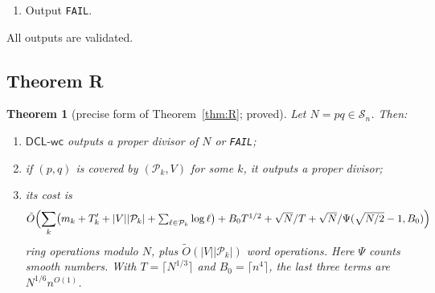 \documentclass[11pt]{amsart}
\newtheorem{theorem}{Theorem}[section]
\theoremstyle{definition}
\newcommand{\Sn}{\mathcal{S}_n}
\newcommand{\DCLwc}{\textsf{DCL-wc}}
\begin{document}
\begin{enumerate}[label=\arabic*.,start=0]
\begin{itemize}
    for $0\le i\le e$, and output any proper value. Otherwise the common order $D$ is now known;
    test $\gcd(1+jD,N)$ for $1\le j\le(\lfloor\sqrt N\rfloor-1)/D$.
  \item \emph{Giants.} Evaluate $f=\prod_{i<m}(X-\gamma^i)$ at all giants as in
    Section~\ref{sec:alg} (for $A<0$ this uses $w_\ell^{-1}$, one inversion per prime). Output any proper gcd, and collect the giants with
    $\gcd(f(G),N)=N$.
  \item \emph{Exploration.} For each such giant, descend the subproduct tree of $f$. At a node
    whose value has gcd $N$, evaluate both children. Output any proper gcd, and descend into the
    children whose gcd is $N$.
  \item \emph{Exact leaf.} If leaf $i$ is reached with $G\equiv\gamma^i\pmod N$, put
    $S=c+\ell^2(g_{\mathrm{lo}}+jm+i)$. If $S^2-4ABN=D_0^2$ is a perfect square, output a proper
    $\gcd((S\pm D_0)/2,N)$.
  \end{itemize}
\item Output \texttt{FAIL}.
\end{enumerate}
All outputs are validated.

\subsection{Theorem R}
\begin{theorem}[precise form of Theorem~\ref{thm:R}; proved]\label{thm:Rprecise}
Let $N=pq\in\Sn$. Then:
\begin{enumerate}[label=(\roman*)]
\item $\DCLwc$ outputs a proper divisor of $N$ or \texttt{FAIL};
\item if $(p,q)$ is covered by $(\mathcal P_k,V)$ for some $k$, it outputs a proper divisor;
\item its cost is
\[
  \tilde O\Bigl(\sum_k\bigl(m_k+T'_k+|V||\mathcal P_k|+\textstyle\sum_{\ell\in\mathcal P_k}\log\ell\bigr)+B_0T^{1/2}+\sqrt N/T
  +\sqrt N/\Psi(\sqrt{N/2}-1,B_0)\Bigr)
\]
ring operations modulo $N$, plus $\tilde O(|V||\mathcal P_k|)$ word operations. Here $\Psi$
counts smooth numbers. With $T=\lceil N^{1/3}\rceil$ and $B_0=\lceil n^4\rceil$, the last three
terms are $N^{1/6}n^{O(1)}$.
\end{enumerate}
\end{theorem}
\end{document}
